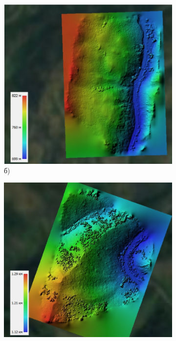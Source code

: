 \begin{figure}[H]
    \centering
    \begin{subfigure}[t]{0.45\textwidth}
        \centering
        \includegraphics[width=\textwidth]{media/ict2/image205}
        \caption*{б)}
    \end{subfigure}
    \begin{subfigure}[t]{0.45\textwidth}
        \centering
        \includegraphics[width=\textwidth]{media/ict2/image206}

\end{subfigure}
\end{figure}
